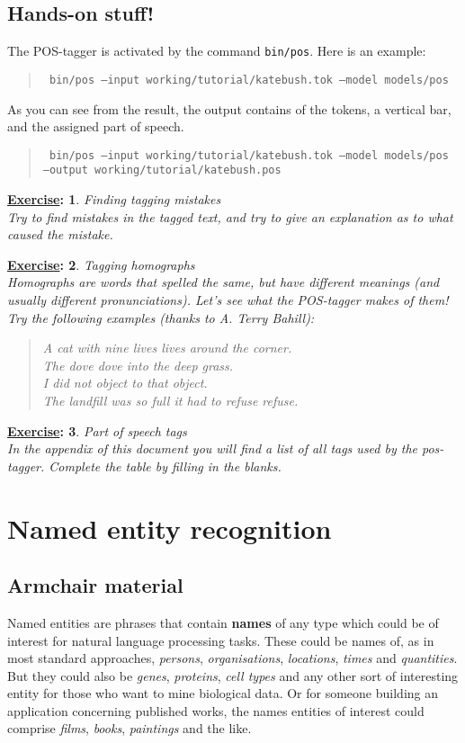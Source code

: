 \documentclass[11pt]{article}
\newtheorem{exercisebb}{\textbf{\underline{Exercise}:}}[section]
\newcommand{\bx}[1]{\begin{exercisebb} \rm #1\\}
\newcommand{\ex}{\end{exercisebb}}
\begin{document}
\clearpage
\subsection*{Hands-on stuff!}

The POS-tagger is activated by the command \texttt{bin/pos}.
Here is an example:

\begin{quote}\tt
bin/pos --input working/tutorial/katebush.tok --model models/pos
\end{quote}

As you can see from the result, the output contains of the tokens, a
vertical bar, and the assigned part of speech.

\begin{quote}\tt
bin/pos --input working/tutorial/katebush.tok --model models/pos --output working/tutorial/katebush.pos
\end{quote}


\bx{Finding tagging mistakes}
Try to find mistakes in the tagged text, and try to give an explanation as to what caused the mistake.
\ex

\bx{Tagging homographs}\label{ex:homographs}
Homographs are words that spelled the same, but have different meanings (and usually different pronunciations).
Let's see what the POS-tagger makes of them! Try the following examples (thanks to A. Terry Bahill):
\begin{quote}
A cat with nine lives lives around the corner.\\
The dove dove into the deep grass.\\
I did not object to that object.\\
The landfill was so full it had to refuse refuse.
\end{quote}
\ex

\bx{Part of speech tags}
In the appendix of this document you will find a list of all tags used by the pos-tagger.
Complete the table by filling in the blanks.
\ex

%
%
\clearpage
\section{Named entity recognition}\label{section:ner}

\subsection*{Armchair material}

Named entities are phrases that contain \textbf{names} of any type
which could be of interest for natural language processing tasks.
These could be names of, as in most standard approaches,
\textit{persons}, \textit{organisations}, \textit{locations},
\textit{times} and \textit{quantities}. But they could also be
\textit{genes}, \textit{proteins}, \textit{cell types} and any other
sort of interesting entity for those who want to mine biological data.
Or for someone building an application concerning published works, the
names entities of interest could comprise \textit{films},
\textit{books}, \textit{paintings} and the like.
\end{document}
